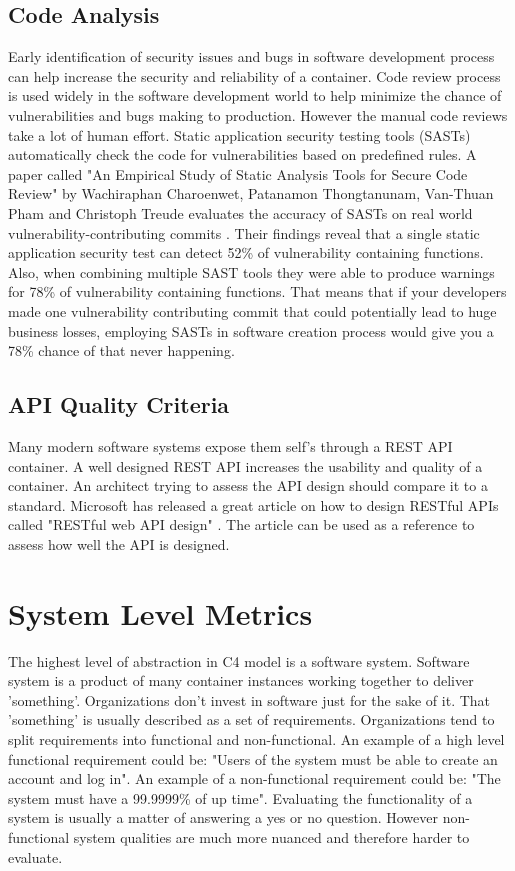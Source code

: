 \documentclass[12pt]{article}
\begin{document}
\subsection{Code Analysis}
Early identification of security issues and bugs in software development process can help increase the security and reliability of a container. Code review process is used widely in the software development world to help minimize the chance of vulnerabilities and bugs making to production. However the manual code reviews take a lot of human effort. Static application security testing tools (SASTs) automatically check the code for vulnerabilities based on predefined rules. A paper called "An Empirical Study of Static Analysis Tools for Secure Code Review" by Wachiraphan Charoenwet, Patanamon Thongtanunam, Van-Thuan Pham and Christoph Treude evaluates the accuracy of SASTs on real world vulnerability-contributing commits \cite{CTP24}. Their findings reveal that a single static application security test can detect 52\% of vulnerability containing functions. Also, when combining multiple SAST tools they were able to produce warnings for 78\% of vulnerability containing functions. That means that if your developers made one vulnerability contributing commit that could potentially lead to huge business losses, employing SASTs in software creation process would give you a 78\% chance of that never happening.


\subsection{API Quality Criteria}
Many modern software systems expose them self's through a REST API container. A well designed REST API increases the usability and quality of a container. An architect trying to assess the API design should compare it to a standard. Microsoft has released a great article on how to design RESTful APIs called "RESTful web API design" \cite{Mic23}. The article can be used as a reference to assess how well the API is designed.
\newpage


\section{System Level Metrics}
The highest level of abstraction in C4 model is a software system. Software system is a product of many container instances working together to deliver 'something'. Organizations don't invest in software just for the sake of it. That 'something' is usually described as a set of requirements. Organizations tend to split requirements into functional and non-functional. An example of a high level functional requirement could be: "Users of the system must be able to create an account and log in". An example of a non-functional requirement could be: "The system must have a 99.9999\% of up time". Evaluating the functionality of a system is usually a matter of answering a yes or no question. However non-functional system qualities are much more nuanced and therefore harder to evaluate.
\end{document}
